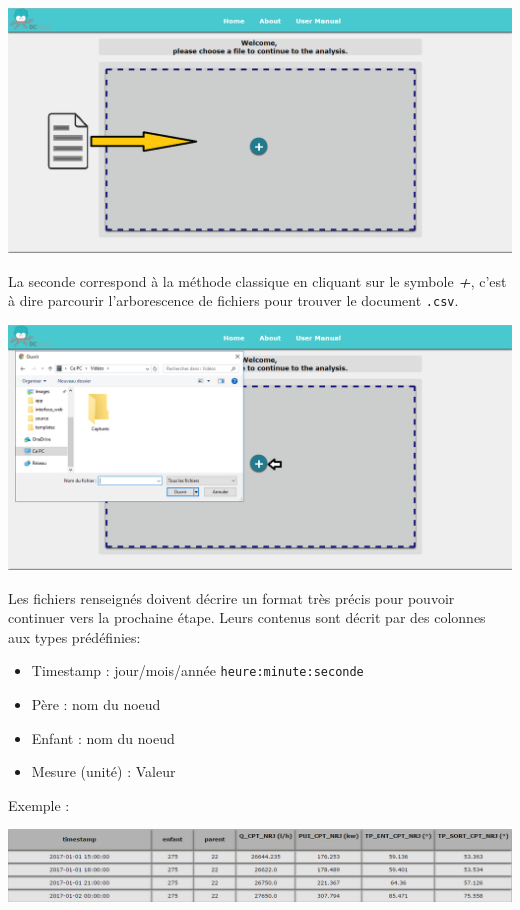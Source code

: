	\begin{center}\includegraphics[scale=0.45]{fenetreDragDrop.png}\end{center}
		  
		 La seconde correspond à la méthode classique en cliquant sur le symbole \textbf{\textit{+}}, c'est à dire parcourir l'arborescence de fichiers pour trouver le document \lstinline!.csv!.\\
		 
	\begin{center}\includegraphics[scale=0.45]{fenetreSGF.png}\end{center}
	
		Les fichiers renseignés doivent décrire un format très précis pour pouvoir continuer vers la prochaine étape. Leurs contenus sont décrit par des colonnes aux types prédéfinies:
		\begin{itemize}
		\item Timestamp : jour/mois/année	\lstinline!heure:minute:seconde!
		\item Père : nom du noeud
		\item Enfant : nom du noeud
		\item Mesure (unité) : Valeur
		\end{itemize}
		Exemple :
		\begin{center}\includegraphics[scale=0.52]{exampleCSV.png}\end{center}
		
